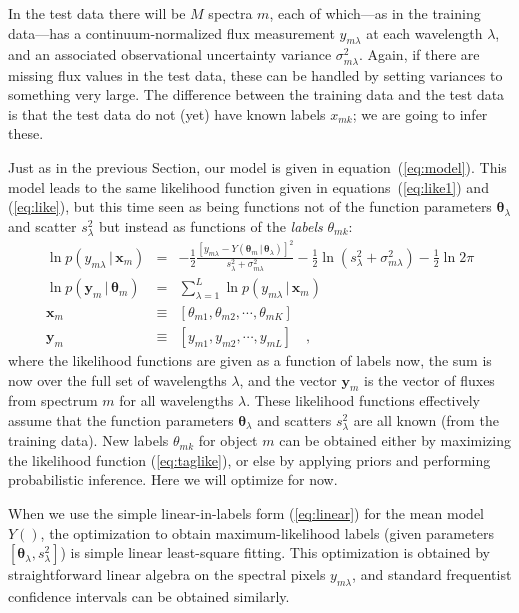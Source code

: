 \documentclass[12pt, preprint]{aastex}
\newcommand{\sectionname}{Section}
\newcommand{\set}[1]{\bm{#1}}
\newcommand{\given}{\,|\,}
\begin{document}
In the test data there will be $M$ spectra $m$, each of which---as in
the training data---has a continuum-normalized flux measurement
$y_{m\lambda}$ at each wavelength $\lambda$, and an
associated observational uncertainty variance $\sigma_{m\lambda}^2$.
Again, if there are missing flux values in the test data, these can be
handled by setting variances to something very large.
The difference between the training data and the test data is that the
test data do not (yet) have known labels $x_{mk}$; we are going to infer
these.

Just as in the previous \sectionname, our model is given in
equation~(\ref{eq:model}).
This model leads to the same likelihood function given in
equations~(\ref{eq:like1}) and (\ref{eq:like}), but this time seen as
being functions not of the function parameters $\set{\theta}_\lambda$ and
scatter $s_\lambda^2$ but instead as functions of the \emph{labels}
$\theta_{mk}$:
\begin{eqnarray}
\ln p(y_{m\lambda}\given\set{x}_m) &=&
 -\frac{1}{2}\frac{[y_{m\lambda} - Y(\set{\theta}_m\given\set{\theta}_\lambda)]^2}{s_\lambda^2 + \sigma_{m\lambda}^2}
 -\frac{1}{2}\ln(s_\lambda^2 + \sigma_{m\lambda}^2)
 -\frac{1}{2}\ln 2\pi
\\
\ln p(\set{y}_m\given\set{\theta}_m) &=&
 \sum_{\lambda=1}^L \ln p(y_{m\lambda}\given\set{x}_m)
\label{eq:taglike}\\
\set{x}_m &\equiv& [\theta_{m1}, \theta_{m2}, \cdots, \theta_{mK}]
\\
\set{y}_m &\equiv& [y_{m1}, y_{m2}, \cdots, y_{mL}]
\quad,
\end{eqnarray}
where the likelihood functions are given as a function of labels now,
the sum is now over the full set of wavelengths
$\lambda$, and the vector $\set{y}_m$ is the vector of fluxes from
spectrum $m$ for all wavelengths $\lambda$.
These likelihood functions effectively assume that the function
parameters $\set{\theta}_\lambda$ and scatters $s_\lambda^2$ are all known (from
the training data).
New labels $\theta_{mk}$ for object $m$ can be obtained either by maximizing
the likelihood function (\ref{eq:taglike}), or else by applying priors
and performing probabilistic inference.
Here we will optimize for now.

When we use the simple linear-in-labels form (\ref{eq:linear}) for the
mean model $Y()$, the optimization to obtain maximum-likelihood labels
(given parameters $[\set{\theta}_\lambda, s_\lambda^2]$) is simple linear
least-square fitting.
This optimization is obtained by straightforward linear algebra on the
spectral pixels $y_{m\lambda}$, and standard frequentist confidence
intervals can be obtained similarly.
\end{document}
